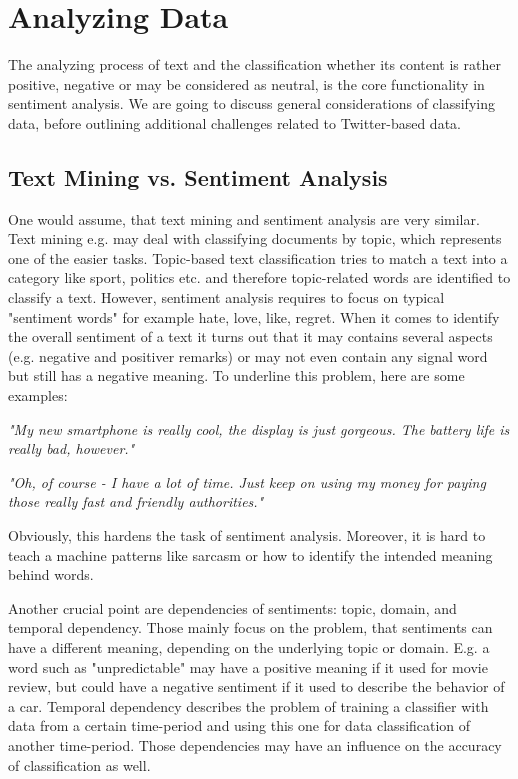 \documentclass{acm_proc_article-sp}
\begin{document}
\section{Analyzing Data} \label{analyzingdata} The analyzing process of text
and the classification whether its content is rather positive, negative or may
be considered as neutral, is the core functionality in sentiment analysis. We
are going to discuss general considerations of classifying data, before
outlining additional challenges related to Twitter-based data.

\subsection{Text Mining vs. Sentiment Analysis} One would assume, that text
mining and sentiment analysis are very similar. Text mining e.g. may deal with
classifying documents by topic, which represents one of the easier tasks.
Topic-based text classification tries to match a text into a category like
sport, politics etc. and therefore topic-related words are identified to
classify a text. However, sentiment analysis requires to focus on typical
"sentiment words" for example hate, love, like, regret.  When it comes to
identify the overall sentiment of a text it turns out that it may contains
several aspects (e.g. negative and positiver remarks) or may not even contain
any signal word but still has a negative meaning.  To underline this problem,
here are some examples:

\textit{"My new smartphone is really cool, the display is just gorgeous. The
battery life is really bad, however."}

\textsl{"Oh, of course - I have a lot of time. Just keep on using my money for
paying those really fast and friendly authorities."}

Obviously, this hardens the task of sentiment analysis. Moreover, it is hard to
teach a machine patterns like sarcasm or how to identify the intended meaning
behind words.  \cite{liu2010sentimentanalysis,pang2008opinion}


Another crucial point are dependencies of sentiments: topic, domain, and
temporal dependency. Those mainly focus on the problem, that sentiments can
have a different meaning, depending on the underlying topic or domain. E.g. a
word such as "unpredictable" may have a positive meaning if it used for movie
review, but could have a negative sentiment if it used to describe the behavior
of a car. Temporal dependency describes the problem of training a classifier
with data from a certain time-period and using this one for data classification
of another time-period.  Those dependencies may have an influence on the
accuracy of classification as well.  \cite{read2005using,pang2008opinion}
\end{document}
